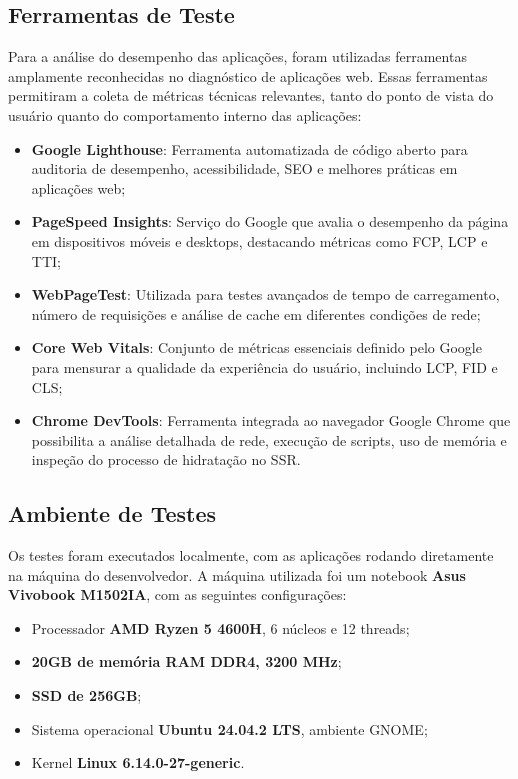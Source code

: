 \subsection{Ferramentas de Teste}

Para a análise do desempenho das aplicações, foram utilizadas ferramentas amplamente reconhecidas no diagnóstico de aplicações web. Essas ferramentas permitiram a coleta de métricas técnicas relevantes, tanto do ponto de vista do usuário quanto do comportamento interno das aplicações:

\begin{itemize}
    \item \textbf{Google Lighthouse}: Ferramenta automatizada de código aberto para auditoria de desempenho, acessibilidade, SEO e melhores práticas em aplicações web;
    \item \textbf{PageSpeed Insights}: Serviço do Google que avalia o desempenho da página em dispositivos móveis e desktops, destacando métricas como FCP, LCP e TTI;
    \item \textbf{WebPageTest}: Utilizada para testes avançados de tempo de carregamento, número de requisições e análise de cache em diferentes condições de rede;
    \item \textbf{Core Web Vitals}: Conjunto de métricas essenciais definido pelo Google para mensurar a qualidade da experiência do usuário, incluindo LCP, FID e CLS;
    \item \textbf{Chrome DevTools}: Ferramenta integrada ao navegador Google Chrome que possibilita a análise detalhada de rede, execução de scripts, uso de memória e inspeção do processo de hidratação no SSR.
\end{itemize}

\subsection{Ambiente de Testes}

Os testes foram executados localmente, com as aplicações rodando diretamente na máquina do desenvolvedor. A máquina utilizada foi um notebook \textbf{Asus Vivobook M1502IA}, com as seguintes configurações:

\begin{itemize}
    \item Processador \textbf{AMD Ryzen 5 4600H}, 6 núcleos e 12 threads;
    \item \textbf{20GB de memória RAM DDR4, 3200 MHz};
    \item \textbf{SSD de 256GB};
    \item Sistema operacional \textbf{Ubuntu 24.04.2 LTS}, ambiente GNOME;
    \item Kernel \textbf{Linux 6.14.0-27-generic}.
\end{itemize}


